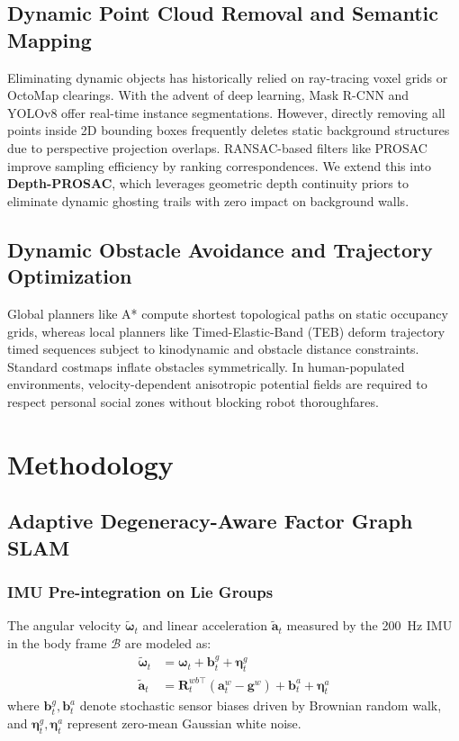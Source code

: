 \documentclass[journal]{IEEEtran}
\begin{document}
\subsection{Dynamic Point Cloud Removal and Semantic Mapping}
Eliminating dynamic objects has historically relied on ray-tracing voxel grids or OctoMap clearings. With the advent of deep learning, Mask R-CNN \cite{he2017mask} and YOLOv8 \cite{jocher2023yolo} offer real-time instance segmentations. However, directly removing all points inside 2D bounding boxes frequently deletes static background structures due to perspective projection overlaps. RANSAC-based filters like PROSAC \cite{chum2005matching} improve sampling efficiency by ranking correspondences. We extend this into \textbf{Depth-PROSAC}, which leverages geometric depth continuity priors to eliminate dynamic ghosting trails with zero impact on background walls.

\subsection{Dynamic Obstacle Avoidance and Trajectory Optimization}
Global planners like A* \cite{hart1968formal} compute shortest topological paths on static occupancy grids, whereas local planners like Timed-Elastic-Band (TEB) \cite{rosmann2013timed} deform trajectory timed sequences subject to kinodynamic and obstacle distance constraints. Standard costmaps inflate obstacles symmetrically. In human-populated environments, velocity-dependent anisotropic potential fields are required to respect personal social zones without blocking robot thoroughfares.

\section{Methodology}

\subsection{Adaptive Degeneracy-Aware Factor Graph SLAM}

\subsubsection{IMU Pre-integration on Lie Groups}
The angular velocity $\tilde{\boldsymbol{\omega}}_t$ and linear acceleration $\tilde{\mathbf{a}}_t$ measured by the 200~Hz IMU in the body frame $\mathcal{B}$ are modeled as:
\begin{align}
\tilde{\boldsymbol{\omega}}_t &= \boldsymbol{\omega}_t + \mathbf{b}_t^g + \boldsymbol{\eta}_t^g \\
\tilde{\mathbf{a}}_t &= \mathbf{R}_t^{wb\top} (\mathbf{a}_t^w - \mathbf{g}^w) + \mathbf{b}_t^a + \boldsymbol{\eta}_t^a
\end{align}
where $\mathbf{b}_t^g, \mathbf{b}_t^a$ denote stochastic sensor biases driven by Brownian random walk, and $\boldsymbol{\eta}_t^g, \boldsymbol{\eta}_t^a$ represent zero-mean Gaussian white noise.
\end{document}
